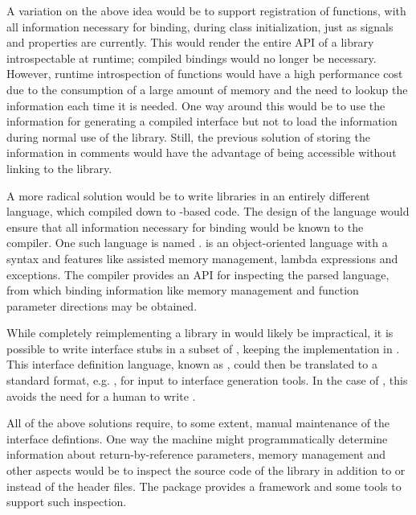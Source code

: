 \documentclass[article,shortnames]{jss}
\begin{document}
A variation on the above idea would be to support registration of
functions, with all information necessary for binding, during class 
initialization, just as signals and properties are currently. This
would render
the entire API of a library introspectable at runtime; compiled
bindings would
no longer be necessary. However, runtime introspection of functions
would
have a high performance cost due to the consumption of a large amount
of memory and the need to lookup the information each time it is
needed.  
One way around this would be to use the information for generating a
compiled interface but not to load the information during normal use
of the library. Still, the previous solution of storing the
information in comments would have the advantage of being accessible
without linking to the library.

A more radical solution would be to write libraries in an entirely
different language,
 which compiled down to -based  code. The
design of the language would ensure that all information necessary for
binding would be known to the compiler. One such language is named
 \citep{vala}.  is an object-oriented
language with a  syntax and features like assisted
memory management, lambda expressions and 
exceptions. The  compiler provides an API for
inspecting the parsed language, from which binding information like
memory management and function parameter directions may be obtained. 

While completely reimplementing a  library in
 would likely be impractical, it is possible to write
interface stubs in a subset of , keeping the
implementation in . This interface definition language,
known as , could then be translated to a standard
format, e.g. , for input to interface generation tools.
In the case of , this avoids the need for a human to
write .

All of the above solutions require, to some extent, manual maintenance
of the interface defintions. One way the machine might
programmatically determine information about
return-by-reference parameters, memory management and other aspects
would be to inspect the  source code of the library in
addition to or instead of the header files. The
 package \citep*{RGCCTU}
provides a framework and some tools to support such inspection.
\end{document}
